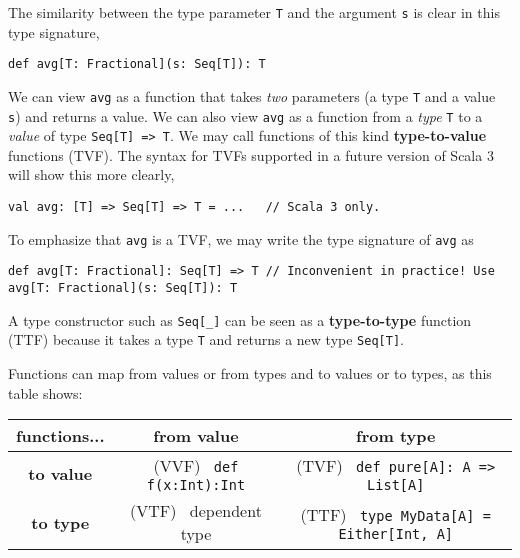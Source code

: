 The similarity between the type parameter \lstinline!T! and the argument
\lstinline!s! is clear in this type signature,
\begin{lstlisting}
def avg[T: Fractional](s: Seq[T]): T
\end{lstlisting}
\begin{comment}
def avg{[}T: Fractional{]}(s : Seq{[}T{]}): T = \{

val frac = implicitly{[}Fractional{[}T{]}{]}

frac.div(s.sum, frac.fromInt(s.length)) 

\}
\end{comment}
We can view \lstinline!avg! as a function that takes \emph{two} parameters
(a type \lstinline!T! and a value \lstinline!s!) and returns a value.
We can also view \lstinline!avg! as a function from a \emph{type}
\lstinline!T! to a \emph{value} of type \lstinline!Seq[T] => T!.
We may call functions of this kind \textbf{type-to-value}
functions (TVF). The syntax for TVFs supported in a future version
of Scala 3 will show this more clearly,
\begin{lstlisting}
val avg: [T] => Seq[T] => T = ...   // Scala 3 only.
\end{lstlisting}
To emphasize that \lstinline!avg! is a TVF, we may write the type
signature of \lstinline!avg! as
\begin{lstlisting}
def avg[T: Fractional]: Seq[T] => T // Inconvenient in practice! Use avg[T: Fractional](s: Seq[T]): T
\end{lstlisting}

A type constructor such as \lstinline!Seq[_]! can be seen as a \textbf{type-to-type}
function (TTF) because it takes a type \lstinline!T! and returns
a new type \lstinline!Seq[T]!.

Functions can map from values or from types and to values or to types,
as this table shows:
\begin{center}
\begin{tabular}{|c|c|c|}
\hline 
\textbf{\small{}functions...} & \textbf{\small{}from value} & \textbf{\small{}from type}\tabularnewline
\hline 
\hline 
\textbf{\small{}to value} & {\small{}(VVF)~ }\lstinline!def f(x:Int):Int! & {\small{}(TVF)~ }\lstinline!def pure[A]: A => List[A]!\tabularnewline
\hline 
\textbf{\small{}to type} & {\small{}(VTF)~ dependent type} & {\small{}(TTF)~ }\lstinline!type MyData[A] = Either[Int, A]!\tabularnewline
\hline 
\end{tabular}
\par\end{center}

